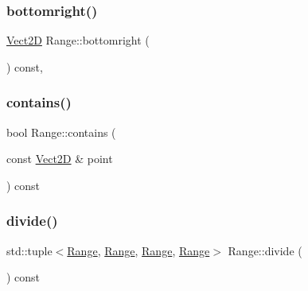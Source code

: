 \mbox{\label{classRange_affd99ce93a18978d79d8c1b4ae8acef9_affd99ce93a18978d79d8c1b4ae8acef9}} 
\subsubsection{\texorpdfstring{bottomright()}{bottomright()}}
{\footnotesize\ttfamily \hyperlink{classVect2D}{Vect2D} Range\+::bottomright (\begin{DoxyParamCaption}{ }\end{DoxyParamCaption}) const\hspace{0.3cm}{\ttfamily [inline]}, {\ttfamily [private]}}

\mbox{\label{classRange_a2d9877708da533077fc2eaeef29b89e4_a2d9877708da533077fc2eaeef29b89e4}} 
\subsubsection{\texorpdfstring{contains()}{contains()}}
{\footnotesize\ttfamily bool Range\+::contains (\begin{DoxyParamCaption}\item[{const \hyperlink{classVect2D}{Vect2D} \&}]{point }\end{DoxyParamCaption}) const\hspace{0.3cm}{\ttfamily [inline]}}

\mbox{\label{classRange_a25a80b49faeb175b80a2028032abbed9_a25a80b49faeb175b80a2028032abbed9}} 
\subsubsection{\texorpdfstring{divide()}{divide()}}
{\footnotesize\ttfamily std\+::tuple$<$\hyperlink{classRange}{Range}, \hyperlink{classRange}{Range}, \hyperlink{classRange}{Range}, \hyperlink{classRange}{Range}$>$ Range\+::divide (\begin{DoxyParamCaption}{ }\end{DoxyParamCaption}) const\hspace{0.3cm}{\ttfamily [inline]}}

